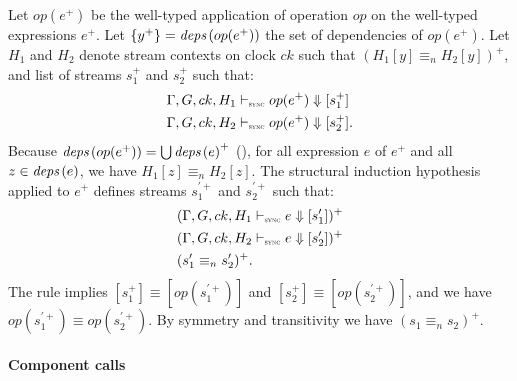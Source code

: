 \begin{skippableproof}
    Let $op(e^+)$ be the well-typed application of operation $op$ on the well-typed expressions
    $e^+$. Let $\{y^+\} = \deps{op(e^+)}$ the set of dependencies of $op(e^+)$. Let $H_1$ and $H_2$
    denote stream contexts on clock $ck$ such that $(H_1[y] \equiv_n H_2[y])^+$, and list of streams
    $s_1^+$ and $s_2^+$ such that:
    \begin{align*}
         & \exprDenot{H_1}{ck}{op(e^+)}{s_1^+}  \\
         & \exprDenot{H_2}{ck}{op(e^+)}{s_2^+}.
    \end{align*}
    Because $\deps{op(e^+)} = \bigcup \deps{e}^+$ (), for all expression $e$ of $e^+$ and all $z \in \deps{e}$, we have
    $H_1[z] \equiv_n H_2[z]$. The structural induction hypothesis applied to $e^+$ defines streams
    $s^{\prime+}_1$ and $s^{\prime+}_2$ such that:
    \begin{align*}
         & (\exprDenot{H_1}{ck}{e}{s'_1})^+ \\
         & (\exprDenot{H_2}{ck}{e}{s'_2})^+ \\
         & (s'_1 \equiv_n s'_2)^+.
    \end{align*}
    The rule  implies $[s_1^+] \equiv [op(s^{\prime+}_1)]$
    and $[s_2^+] \equiv [op(s^{\prime+}_2)]$, and we have $op(s^{\prime+}_1) \equiv
        op(s^{\prime+}_2)$. By symmetry and transitivity we have $(s_1 \equiv_n s_2)^+$.

    \paragraph{Component calls}


\end{skippableproof}
